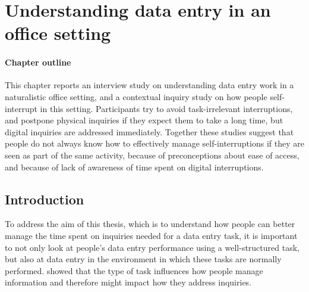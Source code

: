 \chapter{Understanding data entry in an office setting}\label{ch:12}
\begin{mynote}
\subsubsection{Chapter outline}

This chapter reports an interview study on understanding data entry work in a naturalistic office setting, and a contextual inquiry study on how people self-interrupt in this setting. Participants try to avoid task-irrelevant interruptions, and postpone physical inquiries if they expect them to take a long time, but digital inquiries are addressed immediately. Together these studies suggest that people do not always know how to effectively manage self-interruptions if they are seen as part of the same activity, because of preconceptions about ease of access, and because of lack of awareness of time spent on digital interruptions.

\end{mynote}

\section{Introduction}
To address the aim of this thesis, which is to understand how people can better manage the time spent on inquiries needed for a data entry task, it is important to not only look at people's data entry performance using a well-structured task, but also at data entry in the environment in which these tasks are normally performed. \citet{Bondarenko2005} showed that the type of task influences how people manage information and therefore might impact how they address inquiries. 

